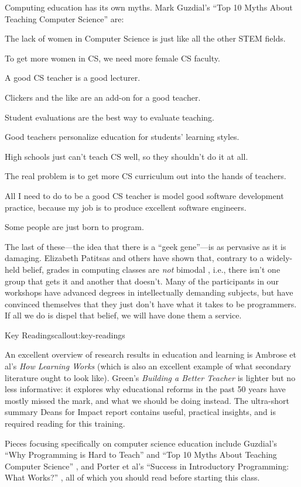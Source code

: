 Computing education has its own myths. Mark Guzdial's
``Top 10 Myths About Teaching Computer Science'' \cite{bib:guzdial-top10} are:

The lack of women in Computer Science is just like all the other STEM
fields.

To get more women in CS, we need more female CS faculty.

A good CS teacher is a good lecturer.

Clickers and the like are an add-on for a good teacher.

Student evaluations are the best way to evaluate teaching.

Good teachers personalize education for students' learning styles.

High schools just can't teach CS well, so they shouldn't do it at all.

The real problem is to get more CS curriculum out into the hands of
teachers.

All I need to do to be a good CS teacher is model good software
development practice, because my job is to produce excellent software
engineers.

Some people are just born to program.

The last of these---the idea that there is a ``geek gene''---is as
pervasive as it is damaging. Elizabeth Patitsas and others have shown
that, contrary to a widely-held belief,
grades in computing classes are \emph{not} bimodal \cite{bib:patitsas-cs-grades},
i.e., there isn't one group that gets
it and another that doesn't. Many of the participants in our workshops
have advanced degrees in intellectually demanding subjects, but have
convinced themselves that they just don't have what it takes to be
programmers. If all we do is dispel that belief, we will have done them
a service.

\begin{callout}{Key Readings}{callout:key-readings}

An excellent overview of research results in education and learning is
Ambrose et al's
\emph{How Learning Works} \cite{bib:ambrose-hlw} (which is also an excellent example of what secondary
literature ought to look like).  Green's
\emph{Building a Better Teacher} \cite{bib:green-babt} is lighter but no less informative: it explores why
educational reforms in the past 50 years have mostly missed the mark,
and what we should be doing instead. The ultra-short summary
Deans for Impact report \cite{bib:deans-for-impact} contains useful, practical insights, and is
required reading for this training.

Pieces focusing specifically on computer science education include
Guzdial's
``Why Programming is Hard to Teach'' \cite{bib:guzdial-hard} and
``Top 10 Myths About Teaching Computer Science'' \cite{bib:guzdial-top10},
and Porter et al's ``Success in Introductory Programming: What Works?'' \cite{bib:porter-what-works},
all of which you should read before starting this class.
\end{callout}

